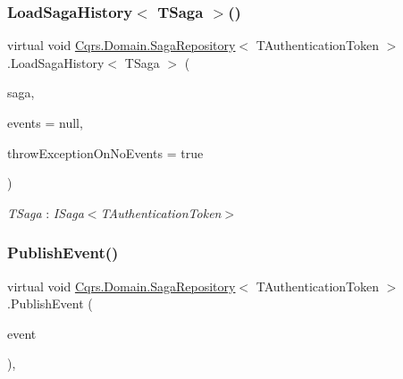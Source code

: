 \subsubsection{\texorpdfstring{Load\+Saga\+History$<$ T\+Saga $>$()}{LoadSagaHistory< TSaga >()}}
{\footnotesize\ttfamily virtual void \hyperlink{classCqrs_1_1Domain_1_1SagaRepository}{Cqrs.\+Domain.\+Saga\+Repository}$<$ T\+Authentication\+Token $>$.Load\+Saga\+History$<$ T\+Saga $>$ (\begin{DoxyParamCaption}\item[{T\+Saga}]{saga,  }\item[{I\+List$<$ \hyperlink{interfaceCqrs_1_1Events_1_1ISagaEvent}{I\+Saga\+Event}$<$ T\+Authentication\+Token $>$$>$}]{events = {\ttfamily null},  }\item[{bool}]{throw\+Exception\+On\+No\+Events = {\ttfamily true} }\end{DoxyParamCaption})\hspace{0.3cm}{\ttfamily [virtual]}}

\begin{Desc}
\item[Type Constraints]\begin{description}
\item[{\em T\+Saga} : {\em I\+Saga$<$T\+Authentication\+Token$>$}]\end{description}
\end{Desc}
\mbox{\label{classCqrs_1_1Domain_1_1SagaRepository_a1dec03959e4d859c6cf2be0507b1bc05_a1dec03959e4d859c6cf2be0507b1bc05}} 
\subsubsection{\texorpdfstring{Publish\+Event()}{PublishEvent()}}
{\footnotesize\ttfamily virtual void \hyperlink{classCqrs_1_1Domain_1_1SagaRepository}{Cqrs.\+Domain.\+Saga\+Repository}$<$ T\+Authentication\+Token $>$.Publish\+Event (\begin{DoxyParamCaption}\item[{\hyperlink{interfaceCqrs_1_1Events_1_1ISagaEvent}{I\+Saga\+Event}$<$ T\+Authentication\+Token $>$ @}]{event }\end{DoxyParamCaption})\hspace{0.3cm}{\ttfamily [protected]}, {\ttfamily [virtual]}}




